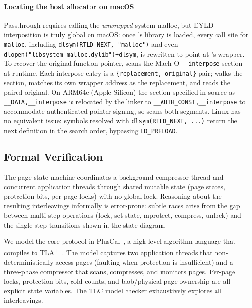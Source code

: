\paragraph{Locating the host allocator on macOS}
Passthrough requires calling the \emph{unwrapped} system malloc,
but DYLD interposition is truly global on macOS: once \sys's
library is loaded, every call site for \texttt{malloc}, including
\texttt{dlsym(RTLD\_\allowbreak NEXT, \allowbreak"malloc")} and
even
\texttt{dlopen("libsystem\_malloc.dylib")+\allowbreak dlsym}, is
rewritten to point at \sys's wrapper.  To recover the original
function pointer, \sys scans the Mach-O \texttt{\_\_interpose}
section at runtime.  Each interpose entry is a
\texttt{\{replacement,\allowbreak\ original\}} pair; \sys walks the
section, matches its own wrapper address as the replacement, and
reads the paired original.  On ARM64e (Apple Silicon) the section
specified in source as \texttt{\_\_DATA,\_\_interpose} is
relocated by the linker to \texttt{\_\_AUTH\_CONST,\_\_interpose}
to accommodate authenticated pointer signing, so \sys scans both
segments.  Linux has no equivalent issue: symbols resolved with
\texttt{dlsym(RTLD\_\allowbreak NEXT,~...)} return the next
definition in the search order, bypassing
\texttt{LD\_\allowbreak PRELOAD}.

\subsection{Formal Verification}
\label{sec:impl:formal}

The page state machine coordinates a background compressor thread
and concurrent application threads through shared mutable state
(page states, protection bits, per-page locks) with no global lock.
Reasoning about the resulting interleavings informally is
error-prone: subtle races arise from the gap between multi-step
operations (lock, set state, mprotect, compress, unlock) and the
single-step transitions shown in the state diagram.

We model the core protocol in PlusCal~\cite{lamport:pluscal}, a
high-level algorithm language that compiles to
TLA\textsuperscript{+}~\cite{lamport:tla}.  The model captures two
application threads that non-deterministically access pages (faulting
when protection is insufficient) and a three-phase compressor that
scans, compresses, and monitors pages.  Per-page locks, protection
bits, cold counts, and blob/physical-page ownership are all explicit
state variables.  The TLC model checker exhaustively explores
all interleavings.

